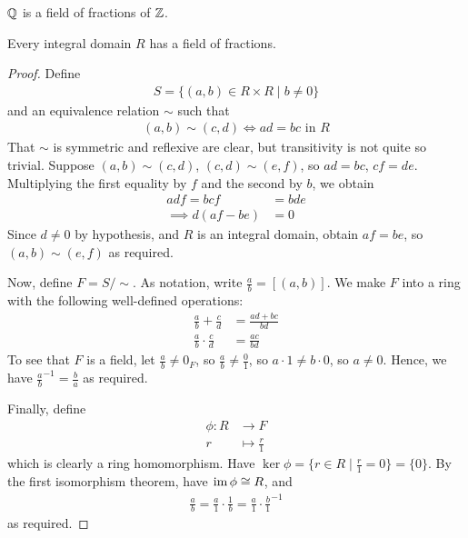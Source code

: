 \documentclass{../template/note}
\begin{document}
    \begin{example*}
        $\mathbb Q$ is a field of fractions of $\mathbb Z$.
    \end{example*}
    
    \begin{theorem}
        Every integral domain $R$ has a field of fractions.
    \end{theorem}

    \begin{proof}
        Define
        \begin{align*}
            S = \{(a, b) \in R \times R \mid b \neq 0\}
        \end{align*}
        and an equivalence relation $\sim$ such that
        \begin{align*}
            (a, b) \sim (c, d) \iff ad = bc \text{ in } R
        \end{align*}
        That $\sim$ is symmetric and reflexive are clear, but transitivity is not quite so trivial. Suppose $(a, b) \sim (c, d)$, $(c, d) \sim (e, f)$, so $ad = bc$, $cf = de$. Multiplying the first equality by $f$ and the second by $b$, we obtain
        \begin{align*}
            adf = bcf &= bde \\
            \implies d(af-be) &= 0
        \end{align*}
        Since $d \neq 0$ by hypothesis, and $R$ is an integral domain, obtain $af = be$, so $(a, b) \sim (e, f)$ as required.
        
        Now, define $F = S/\sim$. As notation, write $\frac ab = [(a, b)]$. We make $F$ into a ring with the following well-defined operations:
        \begin{align*}
            \frac a b + \frac c d &= \frac{ad+bc}{bd} \\
            \frac a b \cdot \frac c d &= \frac{ac}{bd}
        \end{align*}
        To see that $F$ is a field, let $\frac a b \neq 0_F$, so $\frac a b \neq \frac 0 1$, so $a \cdot 1 \neq b \cdot 0$, so $a \neq 0$. Hence, we have ${\frac a b}^{-1} = \frac b a$ as required.

        Finally, define
        \begin{align*}
            \phi: R &\to F \\
            r &\mapsto \frac r 1
        \end{align*}
        which is clearly a ring homomorphism. Have $\ker \phi = \{r \in R \mid \frac r 1 = 0\} = \{0\}$. By the first isomorphism theorem, have $\operatorname{im} \phi \cong R$, and
        \begin{align*}
            \frac a b = \frac a 1 \cdot \frac 1 b = \frac a 1 \cdot {\frac b 1}^{-1}
        \end{align*}
        as required.
    \end{proof}
    
\end{document}

